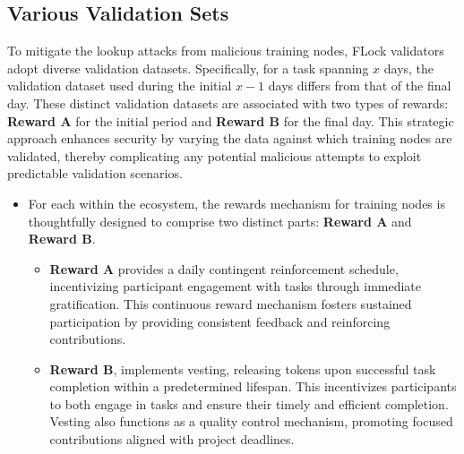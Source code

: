 \documentclass[conference]{IEEEtran}
\begin{document}
\subsection{Various Validation Sets} To mitigate the lookup attacks from malicious training nodes, FLock validators adopt diverse validation datasets. Specifically, for a \SNT task spanning $x$ days, the validation dataset used during the initial $x-1$ days differs from that of the final day. These distinct validation datasets are associated with two types of rewards: \textbf{Reward A} for the initial period and \textbf{Reward B} for the final day. This strategic approach enhances security by varying the data against which training nodes are validated, thereby complicating any potential malicious attempts to exploit predictable validation scenarios.


\begin{itemize}
    \item For each \SNT within the ecosystem, the rewards mechanism for training nodes is thoughtfully designed to comprise two distinct parts: \textbf{Reward A} and \textbf{Reward B}.  

    \begin{itemize}
        \item \textbf{Reward A} provides a daily contingent reinforcement schedule, incentivizing participant engagement with \SNT tasks through immediate gratification. This continuous reward mechanism fosters sustained participation by providing consistent feedback and reinforcing contributions.
        \item \textbf{Reward B}, implements vesting, releasing tokens upon successful task completion within a predetermined lifespan. This incentivizes participants to both engage in tasks and ensure their timely and efficient completion. Vesting also functions as a quality control mechanism, promoting focused contributions aligned with project deadlines.
    \end{itemize}
   

\end{itemize}
\end{document}
